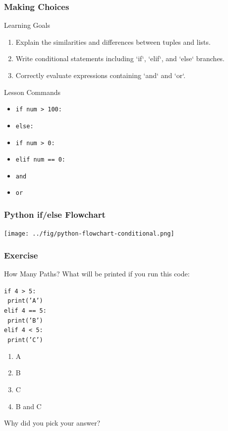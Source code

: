 \documentclass{beamer}
\begin{document}
\begin{frame}[label=conditionals]
  \frametitle{Making Choices}
  \begin{block}{Learning Goals}
    \begin{enumerate}
      \item Explain the similarities and differences between tuples and lists.
      \item Write conditional statements including `if`, `elif`, and `else` branches.
      \item Correctly evaluate expressions containing `and` and `or`.
    \end{enumerate}
  \end{block}
  \begin{block}{Lesson Commands}
    \begin{itemize}
      \item \texttt{if num > 100:}
      \item \texttt{else:}
      \item \texttt{if num > 0:}
      \item \texttt{elif num == 0:}
      \item \texttt{and}
      \item \texttt{or}
    \end{itemize}
  \end{block}
\end{frame}


\begin{frame}
  \frametitle{Python if/else Flowchart}
  \texttt{[image: ../fig/python-flowchart-conditional.png]}
\end{frame}


\begin{frame}
  \frametitle{Exercise}
  \begin{block}{How Many Paths?}
    What will be printed if you run this code:

    \texttt{if 4 > 5:}\\
    \texttt{    print('A')}\\
    \texttt{elif 4 == 5:}\\
    \texttt{    print('B')}\\
    \texttt{elif 4 < 5:}\\
    \texttt{    print('C')}\\

    \begin{enumerate}
      \item A
      \item B
      \item C
      \item B and C
    \end{enumerate}

    Why did you pick your answer?

  \end{block}
\end{frame}
\end{document}
